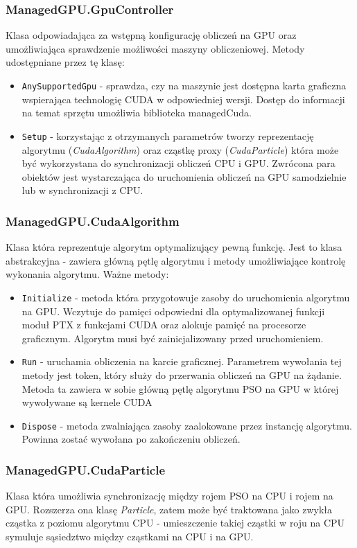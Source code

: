 \documentclass[12pt, twoside, openany, abstract=on]{report}
\theoremstyle{definition}
\begin{document}
\subsubsection{ManagedGPU.GpuController} 
Klasa odpowiadająca za wstępną konfigurację obliczeń na GPU oraz umożliwiająca sprawdzenie możliwości maszyny obliczeniowej. Metody udostępniane przez tę klasę:
\begin{itemize}
\item \texttt{AnySupportedGpu} - sprawdza, czy na maszynie jest dostępna karta graficzna wspierająca technologię CUDA w odpowiedniej wersji. Dostęp do informacji na temat sprzętu umożliwia biblioteka managedCuda.
\item \texttt{Setup} - korzystając z otrzymanych parametrów tworzy reprezentację algorytmu (\textit{CudaAlgorithm}) oraz cząstkę proxy (\textit{CudaParticle}) która może być wykorzystana do synchronizacji obliczeń CPU i GPU. Zwrócona para obiektów jest wystarczająca do uruchomienia obliczeń na GPU samodzielnie lub w synchronizacji z CPU.
\end{itemize}

\subsubsection{ManagedGPU.CudaAlgorithm} 
Klasa która reprezentuje algorytm optymalizujący pewną funkcję. Jest to klasa abstrakcyjna - zawiera główną pętlę algorytmu i metody umożliwiające kontrolę wykonania algorytmu. Ważne metody:
\begin{itemize}
\item \texttt{Initialize} - metoda która przygotowuje zasoby do uruchomienia algorytmu na GPU. Wczytuje do pamięci odpowiedni dla optymalizowanej funkcji moduł PTX z funkcjami CUDA oraz alokuje pamięć na procesorze graficznym. Algorytm musi być zainicjalizowany przed uruchomieniem.
\item \texttt{Run} - uruchamia obliczenia na karcie graficznej. Parametrem wywołania tej metody jest token, który służy do przerwania obliczeń na GPU na żądanie. Metoda ta zawiera w sobie główną pętlę algorytmu PSO na GPU w której wywoływane są kernele CUDA 
\item \texttt{Dispose} - metoda zwalniająca zasoby zaalokowane przez instancję algorytmu. Powinna zostać wywołana po zakończeniu obliczeń.
\end{itemize}

\subsubsection{ManagedGPU.CudaParticle} 
Klasa która umożliwia synchronizację między rojem PSO na CPU i rojem na GPU. Rozszerza ona klasę \textit{Particle}, zatem może być traktowana jako zwykła cząstka z poziomu algorytmu CPU - umieszczenie takiej cząstki w roju na CPU symuluje sąsiedztwo między cząstkami na CPU i na GPU.
\end{document}
